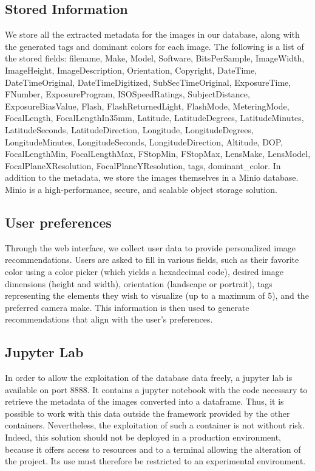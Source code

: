 \documentclass{article}
\begin{document}
    \subsection{Stored Information}\label{subsec:stored_infos}
    We store all the extracted metadata for the images in our database, along with the generated tags and dominant colors for each image.
    The following is a list of the stored fields: filename, Make, Model, Software, BitsPerSample, ImageWidth, ImageHeight, ImageDescription, Orientation, Copyright, DateTime, DateTimeOriginal, DateTimeDigitized, SubSecTimeOriginal, ExposureTime, FNumber, ExposureProgram, ISOSpeedRatings, SubjectDistance, ExposureBiasValue, Flash, FlashReturnedLight, FlashMode, MeteringMode, FocalLength, FocalLengthIn35mm, Latitude, LatitudeDegrees, LatitudeMinutes, LatitudeSeconds, LatitudeDirection, Longitude, LongitudeDegrees, LongitudeMinutes, LongitudeSeconds, LongitudeDirection, Altitude, DOP, FocalLengthMin, FocalLengthMax, FStopMin, FStopMax, LensMake, LensModel, FocalPlaneXResolution, FocalPlaneYResolution, tags, dominant\_color.
    In addition to the metadata, we store the images themselves in a Minio database.
    Minio is a high-performance, secure, and scalable object storage solution.

    \subsection{User preferences}\label{subsec:user_pref}
    Through the web interface, we collect user data to provide personalized image recommendations.
    Users are asked to fill in various fields, such as their favorite color using a color picker (which yields a hexadecimal code),
    desired image dimensions (height and width), orientation (landscape or portrait),
    tags representing the elements they wish to visualize (up to a maximum of 5), and the preferred camera make.
    This information is then used to generate recommendations that align with the user's preferences.

    \subsection{Jupyter Lab}\label{subsec:jupyter_lab}
    In order to allow the exploitation of the database data freely, a jupyter lab is available on port 8888.
    It contains a jupyter notebook with the code necessary to retrieve the metadata of the images converted into a dataframe.
    Thus, it is possible to work with this data outside the framework provided by the other containers.
    Nevertheless, the exploitation of such a container is not without risk.
    Indeed, this solution should not be deployed in a production environment, because it offers access to resources and to a terminal allowing the alteration of the project.
    Its use must therefore be restricted to an experimental environment.
\end{document}
